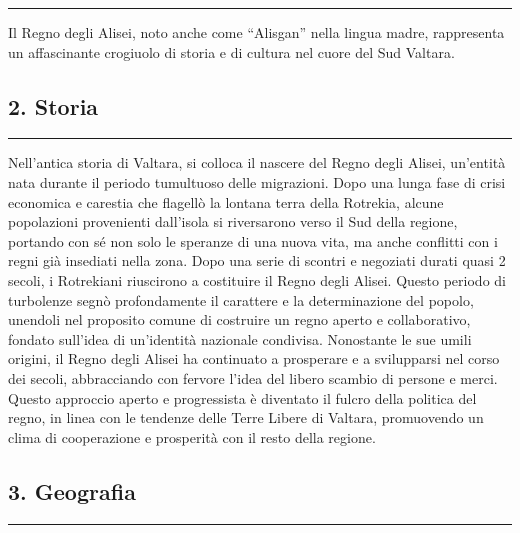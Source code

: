 \begin{center}\rule{0.5\linewidth}{0.5pt}\end{center}

Il Regno degli Alisei, noto anche come ``Alisgan'' nella lingua madre,
rappresenta un affascinante crogiuolo di storia e di cultura nel cuore
del Sud Valtara.

\subsection{2. Storia}\label{storia}

\begin{center}\rule{0.5\linewidth}{0.5pt}\end{center}

Nell'antica storia di Valtara, si colloca il nascere del Regno degli
Alisei, un'entità nata durante il periodo tumultuoso delle migrazioni.
Dopo una lunga fase di crisi economica e carestia che flagellò la
lontana terra della Rotrekia, alcune popolazioni provenienti dall'isola
si riversarono verso il Sud della regione, portando con sé non solo le
speranze di una nuova vita, ma anche conflitti con i regni già insediati
nella zona. Dopo una serie di scontri e negoziati durati quasi 2 secoli,
i Rotrekiani riuscirono a costituire il Regno degli Alisei. Questo
periodo di turbolenze segnò profondamente il carattere e la
determinazione del popolo, unendoli nel proposito comune di costruire un
regno aperto e collaborativo, fondato sull'idea di un'identità nazionale
condivisa. Nonostante le sue umili origini, il Regno degli Alisei ha
continuato a prosperare e a svilupparsi nel corso dei secoli,
abbracciando con fervore l'idea del libero scambio di persone e merci.
Questo approccio aperto e progressista è diventato il fulcro della
politica del regno, in linea con le tendenze delle Terre Libere di
Valtara, promuovendo un clima di cooperazione e prosperità con il resto
della regione.

\subsection{3. Geografia}\label{geografia}

\begin{center}\rule{0.5\linewidth}{0.5pt}\end{center}

